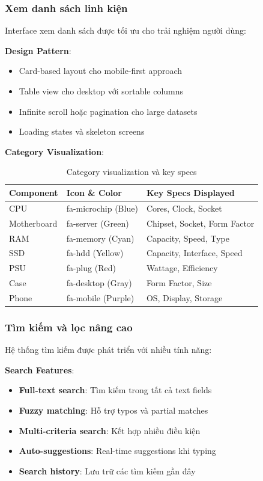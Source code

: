 \documentclass[12pt,a4paper]{article}
\begin{document}
\subsubsection{Xem danh sách linh kiện}
Interface xem danh sách được tối ưu cho trải nghiệm người dùng:

\textbf{Design Pattern}:
\begin{itemize}
    \item Card-based layout cho mobile-first approach
    \item Table view cho desktop với sortable columns
    \item Infinite scroll hoặc pagination cho large datasets
    \item Loading states và skeleton screens
\end{itemize}

\textbf{Category Visualization}:
\begin{table}[H]
\centering
\begin{tabular}{@{}lll@{}}
\toprule
\textbf{Component} & \textbf{Icon \& Color} & \textbf{Key Specs Displayed} \\
\midrule
CPU & fa-microchip (Blue) & Cores, Clock, Socket \\
Motherboard & fa-server (Green) & Chipset, Socket, Form Factor \\
RAM & fa-memory (Cyan) & Capacity, Speed, Type \\
SSD & fa-hdd (Yellow) & Capacity, Interface, Speed \\
PSU & fa-plug (Red) & Wattage, Efficiency \\
Case & fa-desktop (Gray) & Form Factor, Size \\
Phone & fa-mobile (Purple) & OS, Display, Storage \\
\bottomrule
\end{tabular}
\caption{Category visualization và key specs}
\end{table}

\subsubsection{Tìm kiếm và lọc nâng cao}
Hệ thống tìm kiếm được phát triển với nhiều tính năng:

\textbf{Search Features}:
\begin{itemize}
    \item \textbf{Full-text search}: Tìm kiếm trong tất cả text fields
    \item \textbf{Fuzzy matching}: Hỗ trợ typos và partial matches
    \item \textbf{Multi-criteria search}: Kết hợp nhiều điều kiện
    \item \textbf{Auto-suggestions}: Real-time suggestions khi typing
    \item \textbf{Search history}: Lưu trữ các tìm kiếm gần đây
\end{itemize}
\end{document}
